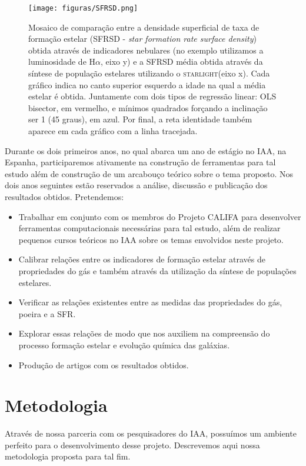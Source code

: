 \documentclass[a4paper,12pt]{article}
\def\starlight{\textsc{starlight}\xspace}      %
\begin{document}
\begin{figure}
	\begin{center}
    \texttt{[image: figuras/SFRSD.png]}
    \caption[]{Mosaico de comparação entre a densidade superficial de taxa de formação estelar
    (SFRSD - {\em star formation rate surface density}) obtida através de indicadores nebulares (no
    exemplo utilizamos a luminosidade de H$\alpha$, eixo y) e a SFRSD média obtida através da
    síntese de população estelares utilizando o \starlight (eixo x). Cada gráfico indica no canto
    superior esquerdo a idade na qual a média estelar é obtida. Juntamente com dois tipos de
    regressão linear: OLS bisector, em vermelho, e mínimos quadrados forçando a inclinação ser
    1 (45 graus), em azul. Por final, a reta identidade também aparece em cada gráfico com a linha
    tracejada.}
    \label{fig:SFRSDgasXSFRSDstar}
    \end{center}
\end{figure}

Durante os dois primeiros anos, no qual abarca um ano de estágio no IAA, na Espanha, participaremos
ativamente na construção de ferramentas para tal estudo além de construção de um arcabouço teórico
sobre o tema proposto. Nos dois anos seguintes estão reservados a análise, discussão e publicação
dos resultados obtidos. Pretendemos:

\begin{itemize}
  \item Trabalhar em conjunto com os membros do Projeto CALIFA para desenvolver ferramentas
  computacionais necessárias para tal estudo, além de realizar pequenos cursos teóricos no IAA sobre
  os temas envolvidos neste projeto.
  \item Calibrar relações entre os indicadores de formação estelar através de propriedades do gás e
  também através da utilização da síntese de populações estelares.
  \item Verificar as relações existentes entre as medidas das propriedades do gás, poeira e a SFR.
  \item Explorar essas relações de modo que nos auxiliem na compreensão do processo formação estelar
  e evolução química das galáxias.
  \item Produção de artigos com os resultados obtidos.
\end{itemize}

\section{Metodologia}
\vspace{0.3cm}
Através de nossa parceria com os pesquisadores do IAA, possuímos um ambiente perfeito para o
desenvolvimento desse projeto. Descrevemos aqui nossa metodologia proposta para tal fim.
\end{document}
